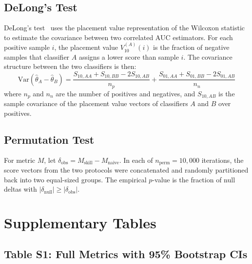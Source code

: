 \documentclass[11pt,a4paper]{article}
\begin{document}
\subsection{DeLong's Test}

DeLong's test~\citep{delong1988} uses the placement value representation of the Wilcoxon statistic to estimate the covariance between two correlated AUC estimators. For each positive sample $i$, the placement value $V_{10}^{(A)}(i)$ is the fraction of negative samples that classifier $A$ assigns a lower score than sample $i$. The covariance structure between the two classifiers is then:
\begin{equation}
  \text{Var}(\hat{\theta}_A - \hat{\theta}_B) =
    \frac{S_{10,AA} + S_{10,BB} - 2 S_{10,AB}}{n_p} +
    \frac{S_{01,AA} + S_{01,BB} - 2 S_{01,AB}}{n_n}
\end{equation}
where $n_p$ and $n_n$ are the number of positives and negatives, and $S_{10,AB}$ is the sample covariance of the placement value vectors of classifiers $A$ and $B$ over positives.

\subsection{Permutation Test}

For metric $M$, let $\delta_\text{obs} = M_\text{skill} - M_\text{naive}$. In each of $n_\text{perm} = 10{,}000$ iterations, the score vectors from the two protocols were concatenated and randomly partitioned back into two equal-sized groups. The empirical $p$-value is the fraction of null deltas with $|\delta_\text{null}| \geq |\delta_\text{obs}|$.

\section{Supplementary Tables}

\subsection{Table S1: Full Metrics with 95\% Bootstrap CIs}
\end{document}
